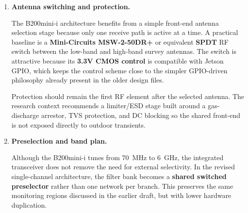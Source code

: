 \documentclass[11pt,a4paper]{article}
\begin{document}
\begin{enumerate}[label=\roman*)]

	\item \textbf{Antenna switching and protection.}

	The B200mini-i architecture benefits from a simple front-end antenna selection
	stage because only one receive path is active at a time. A practical baseline is
	a \textbf{Mini-Circuits MSW-2-50DR+} or equivalent \textbf{SPDT} RF switch
	between the low-band and high-band survey antennas. The switch is attractive
	because its \textbf{3.3V CMOS control} is compatible with Jetson GPIO, which
	keeps the control scheme close to the simpler GPIO-driven philosophy already
	present in the older design files.

	Protection should remain the first RF element after the selected antenna. The
	research context recommends a limiter/ESD stage built around a gas-discharge
	arrestor, TVS protection, and DC blocking so the shared front-end is not exposed
	directly to outdoor transients.

	\item \textbf{Preselection and band plan.}

	Although the B200mini-i tunes from 70~MHz to 6~GHz, the integrated transceiver
	does not remove the need for external selectivity. In the revised single-channel
	architecture, the filter bank becomes a \textbf{shared switched preselector}
	rather than one network per branch. This preserves the same monitoring regions
	discussed in the earlier draft, but with lower hardware duplication.

	\begin{table}[htbp]
		\centering
		\small
\end{table}
\end{enumerate}
\end{document}
